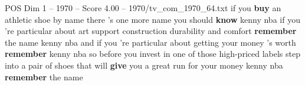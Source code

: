 \begin{textsample}{POS Dim 1 – 1970 – Score 4.00 – 1970/tv\_com\_1970\_64.txt}  \label{ex:f1_pos_036}
if you \textbf{buy} an athletic shoe by name there 's one more name you should \textbf{know} kenny nba if you 're particular about art support construction durability and comfort \textbf{remember} the name kenny nba and if you 're particular about getting your money 's worth \textbf{remember} kenny nba so before you invest in one of those high-priced labels step into a pair of shoes that will \textbf{give} you a great run for your money kenny nba \textbf{remember} the name

\end{textsample}
